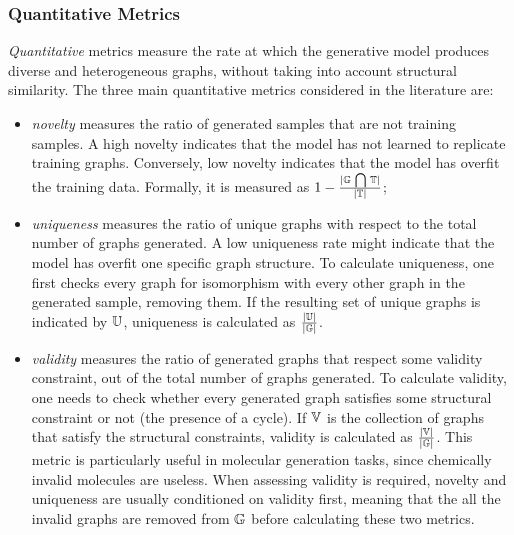\subsubsection*{Quantitative Metrics}
\emph{Quantitative} metrics measure the rate at which the generative model produces diverse and heterogeneous graphs, without taking into account structural similarity. The three main quantitative metrics considered in the literature are:
\begin{itemize}
    \item \emph{novelty} measures the ratio of generated samples that are not training samples. A high novelty indicates that the model has not learned to replicate training graphs. Conversely, low novelty indicates that the model has overfit the training data. Formally, it is measured as $1 - \frac{|\mathbb{G} \,\bigcap\limits\, \mathbb{T}|}{|\mathbb{T}|}$;
    \item \emph{uniqueness} measures the ratio of unique graphs with respect to the total number of graphs generated. A low uniqueness rate might indicate that the model has overfit one specific graph structure. To calculate uniqueness, one first checks every graph for isomorphism with every other graph in the generated sample, removing them. If the resulting set of unique graphs is indicated by $\mathbb{U}$, uniqueness is calculated as $\frac{|\mathbb{U}|}{|\mathbb{G}|}$.
    \item \emph{validity} measures the ratio of generated graphs that respect some validity constraint, out of the total number of graphs generated. To calculate validity, one needs to check whether every generated graph satisfies some structural constraint or not (\eg the presence of a cycle). If $\mathbb{V}$ is the collection of graphs that satisfy the structural constraints, validity is calculated as $\frac{|\mathbb{V}|}{|\mathbb{G}|}$. This metric is particularly useful in molecular generation tasks, since chemically invalid molecules are useless. When assessing validity is required, novelty and uniqueness are usually conditioned on validity first, meaning that the all the invalid graphs are removed from $\mathbb{G}$ before calculating these two metrics.
\end{itemize}

